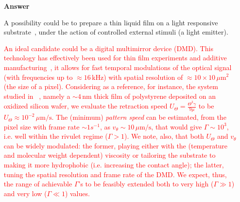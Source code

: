 \documentclass[12pt,english]{article}
\newcommand{\JH}[1]{\textcolor{blue}{JH: #1}}
\begin{document}
\begin{itemize}
\item[ \textbf{{Answer}}]
{
A possibility could be to prepare a thin liquid film on a light responsive substrate~\cite{IchimuraEtAl_Science2000}, under the action of controlled 
external stimuli (a light emitter). 

\textcolor{red}{An ideal candidate could be a digital multimirror device (DMD).
This technology has effectively been used for thin film experiments and additive manufacturing~\cite{doi:10.1021/jp301092y, doi:10.1126/science.aax8760}, it allows for fast temporal modulations of the optical signal (with frequencies up to $\approx 16 \, \text{kHz}$)
with spatial resolution of $\approx 10 \times 10 \, \mu \text{m}^2$ (the size of a pixel).
Considering as a reference, for instance, the system studied in ~\cite{becker2003complex,PhysRevLett.99.114503}, namely a $\sim 4 \, \text{nm}$ thick film 
of polystyrene deposited on an oxidized silicon wafer,  
we evaluate the retraction speed 
$U_{\Theta} = \frac{\Theta^3 \gamma}{9 \mu}$ to be 
$U_{\Theta} \approx 10^{-2} \, \mu \text{m}/\text{s}$. 
The (minimum) {\it pattern speed} can be 
estimated, from the pixel size with frame rate $\sim 1 s^{-1}$, as 
$v_{\theta} \sim 10 \, \mu \text{m}/\text{s}$, that would give $\Gamma \sim 10^3$, i.e. well within 
the rivulet regime ($\Gamma > 1$). We note, also, that both $U_{\Theta}$ and $v_{\theta}$ can 
be widely modulated: the former, playing either with the (temperature and molecular weight dependent) viscosity 
or tailoring the substrate to making it more hydrophobic (i.e. increasing the contact angle); the latter, tuning
the spatial resolution and frame rate of the DMD. We expect, thus, the range of achievable $\Gamma$'s to 
be feasibly extended both to very high ($\Gamma \gg 1$) and very low ($\Gamma \ll 1$) values.} 

}
\end{itemize}
\end{document}
